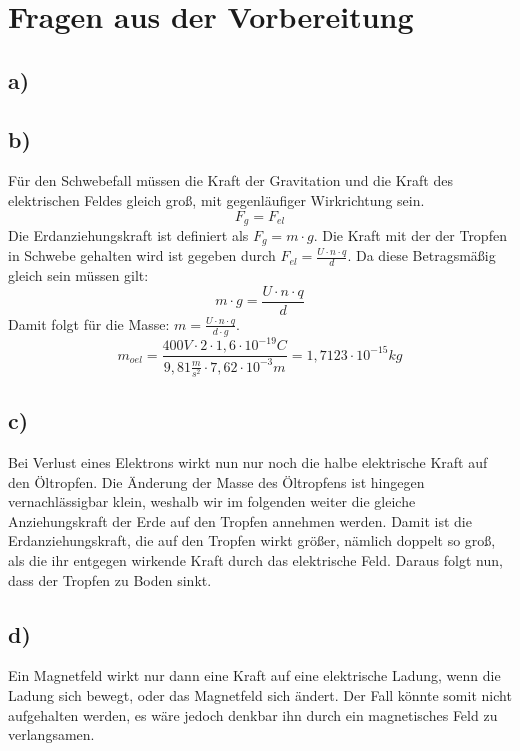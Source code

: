 \section*{Fragen aus der Vorbereitung}
\subsection*{a)}
\subsection*{b)}
Für den Schwebefall müssen die Kraft der Gravitation und die Kraft des elektrischen Feldes gleich groß, mit gegenläufiger Wirkrichtung sein.
\[F_g = F_{el}\]
Die Erdanziehungskraft ist definiert als $F_g = m \cdot g$. Die Kraft mit der der Tropfen in Schwebe gehalten wird ist gegeben durch $F_{el} = \frac{U\cdot n \cdot q}{d} $. Da diese Betragsmäßig gleich sein müssen gilt:
\[m \cdot g  = \frac{U\cdot n \cdot q}{d}\]
Damit folgt für die Masse: $m = \frac{U\cdot n \cdot q}{d \cdot g}$.
\[m_{oel} = \frac{400V \cdot 2 \cdot 1,6 \cdot 10^{-19}C}{9,81\frac{m}{s^2} \cdot 7,62 \cdot 10^{-3}m} = 1,7123\cdot10^{-15}kg\]
\subsection*{c)}
Bei Verlust eines Elektrons wirkt nun nur noch die halbe elektrische Kraft auf den Öltropfen. Die Änderung der Masse des Öltropfens ist hingegen vernachlässigbar klein, weshalb wir im folgenden weiter die gleiche Anziehungskraft der Erde auf den Tropfen annehmen werden. Damit ist die Erdanziehungskraft, die auf den Tropfen wirkt größer, nämlich doppelt so groß, als die ihr entgegen wirkende Kraft durch das elektrische Feld. Daraus folgt nun, dass der Tropfen zu Boden sinkt.
\subsection*{d)}
Ein Magnetfeld wirkt nur dann eine Kraft auf eine elektrische Ladung, wenn die Ladung sich bewegt, oder das Magnetfeld sich ändert. Der Fall könnte somit nicht aufgehalten werden, es wäre jedoch denkbar ihn durch ein magnetisches Feld zu verlangsamen.